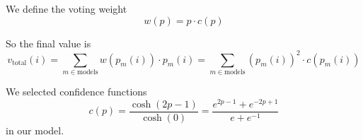 We define the voting weight
\begin{equation}
w(p) = p\cdot c(p)
\end{equation}

So the final value is
\begin{equation}
    v_{\text{total}}(i) = \sum_{m\in\text{models}}w(p_m(i))\cdot p_m(i) = \sum_{m\in\text{models}}\left(p_m(i)\right)^2\cdot c(p_m(i))
\end{equation}

We selected confidence functions
\begin{equation}
    c(p) = \frac{\cosh(2p-1)}{\cosh(0)} = \frac{e^{2p-1}+e^{-2p+1}}{e +e^{-1}}
\end{equation}
in our model.
